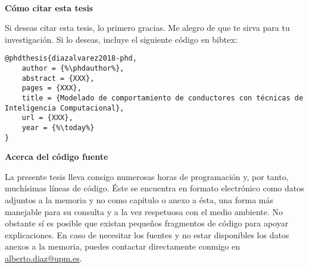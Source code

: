 \cleardoublepage
\begin{fullwidth}
~\vfill
\thispagestyle{empty}
\setlength{\parindent}{0pt}
\setlength{\parskip}{\baselineskip}

\par{
	\textbf{Cómo citar esta tesis}
	
	Si deseas citar esta tesis, lo primero gracias. Me alegro de que te sirva para tu investigación. Si lo deseas, incluye el siguiente código en bibtex:
	
	\begin{lstlisting}[escapechar=\%]
@phdthesis{diazalvarez2018-phd,
	author = {%\phdauthor%},
	abstract = {XXX},
	pages = {XXX},
	title = {Modelado de comportamiento de conductores con técnicas de Inteligencia Computacional},
	url = {XXX},
	year = {%\today%}
}
	\end{lstlisting}
}

\par{
	\textbf{Acerca del código fuente}
	
	La presente tesis lleva consigo numerosas horas de programación y, por tanto, muchísimas líneas de código. Éste se encuentra en formato electrónico como datos adjuntos a la memoria y no como capítulo o anexo a ésta, una forma más manejable para su consulta y a la vez respetuosa con el medio ambiente. No obstante sí es posible que existan pequeños fragmentos de código para apoyar explicaciones. En caso de necesitar los fuentes y no estar disponibles los datos anexos a la memoria, puedes contactar directamente conmigo en \url{alberto.diaz@upm.es}.
}

\end{fullwidth}

